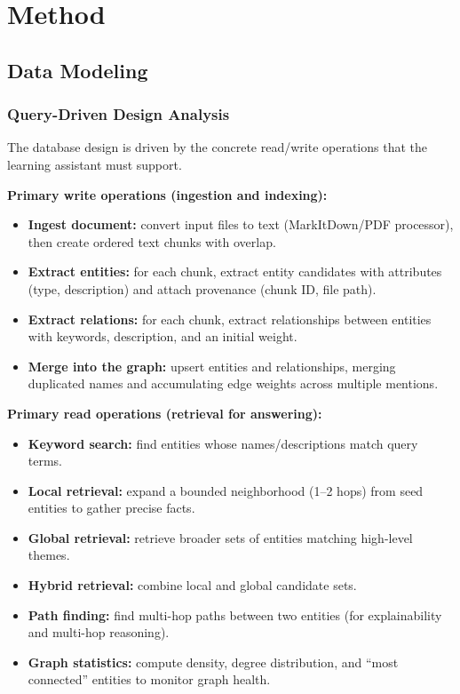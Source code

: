 \section{Method}
\usetikzlibrary{positioning}
\lstset{style=CStyle}

\subsection{Data Modeling}

\subsubsection{Query-Driven Design Analysis}
The database design is driven by the concrete read/write operations that the learning assistant must support.

\textbf{Primary write operations (ingestion and indexing):}
\begin{itemize}
    \item \textbf{Ingest document:} convert input files to text (MarkItDown/PDF processor), then create ordered text chunks with overlap.
    \item \textbf{Extract entities:} for each chunk, extract entity candidates with attributes (type, description) and attach provenance (chunk ID, file path).
    \item \textbf{Extract relations:} for each chunk, extract relationships between entities with keywords, description, and an initial weight.
    \item \textbf{Merge into the graph:} upsert entities and relationships, merging duplicated names and accumulating edge weights across multiple mentions.
\end{itemize}

\textbf{Primary read operations (retrieval for answering):}
\begin{itemize}
    \item \textbf{Keyword search:} find entities whose names/descriptions match query terms.
    \item \textbf{Local retrieval:} expand a bounded neighborhood (1--2 hops) from seed entities to gather precise facts.
    \item \textbf{Global retrieval:} retrieve broader sets of entities matching high-level themes.
    \item \textbf{Hybrid retrieval:} combine local and global candidate sets.
    \item \textbf{Path finding:} find multi-hop paths between two entities (for explainability and multi-hop reasoning).
    \item \textbf{Graph statistics:} compute density, degree distribution, and ``most connected'' entities to monitor graph health.
\end{itemize}


